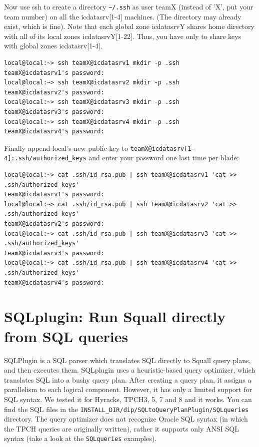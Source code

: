 \documentclass[a4paper,10pt]{article}
\begin{document}
Now use ssh to create a directory \verb|~/.ssh| as user teamX (instead of 'X', put your team number) on all the icdatasrv[1-4] machines. (The directory may already exist, which is fine). Note that each global zone icdatasrvY shares home directory with all of its local zones icdatasrvY[1-22]. Thus, you have only to share keys with global zones icdatasrv[1-4].
\begin{verbatim}
local@local:~> ssh teamX@icdatasrv1 mkdir -p .ssh
teamX@icdatasrv1's password: 
local@local:~> ssh teamX@icdatasrv2 mkdir -p .ssh
teamX@icdatasrv2's password: 
local@local:~> ssh teamX@icdatasrv3 mkdir -p .ssh
teamX@icdatasrv3's password: 
local@local:~> ssh teamX@icdatasrv4 mkdir -p .ssh
teamX@icdatasrv4's password: 
\end{verbatim}

Finally append local's new public key to \verb#teamX@icdatasrv[1-4]:.ssh/authorized_keys# and enter your password one last time per blade:
\begin{verbatim}
local@local:~> cat .ssh/id_rsa.pub | ssh teamX@icdatasrv1 'cat >> .ssh/authorized_keys'
teamX@icdatasrv1's password: 
local@local:~> cat .ssh/id_rsa.pub | ssh teamX@icdatasrv2 'cat >> .ssh/authorized_keys'
teamX@icdatasrv2's password: 
local@local:~> cat .ssh/id_rsa.pub | ssh teamX@icdatasrv3 'cat >> .ssh/authorized_keys'
teamX@icdatasrv3's password: 
local@local:~> cat .ssh/id_rsa.pub | ssh teamX@icdatasrv4 'cat >> .ssh/authorized_keys'
teamX@icdatasrv4's password: 
\end{verbatim}

\section{SQLplugin: Run Squall directly from SQL queries}
\vspace{2mm}
SQLPlugin is a SQL parser which translates SQL directly to Squall query plans, and then executes them. SQLplugin uses a heuristic-based query optimizer, which translates SQL into a bushy query plan. After creating a query plan, it assigns a parallelism to each logical component. However, it has only a limited support for SQL syntax. We tested it for Hyracks, TPCH3, 5, 7 and 8 and it works. You can find the SQL files in the \verb|INSTALL_DIR/dip/SQLtoQueryPlanPlugin/SQLqueries| directory. The query optimizer does not recognize Oracle SQL syntax (in which the TPCH queries are originally written), rather it supports only ANSI SQL syntax (take a look at the \verb|SQLqueries| examples).
\end{document}
